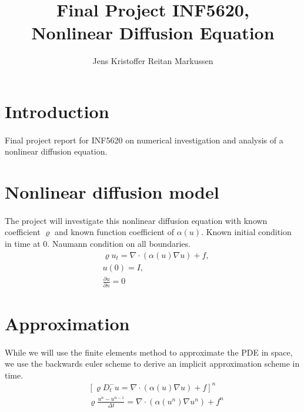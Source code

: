 \documentclass[11pt,a4paper]{article}
\author{Jens Kristoffer Reitan Markussen}
\title{Final Project INF5620,\\ Nonlinear Diffusion Equation}
\begin{document}
\maketitle

\section{Introduction}
\paragraph*{}
Final project report for INF5620 on numerical investigation and analysis of a nonlinear diffusion equation.

\section{Nonlinear diffusion model}
\paragraph*{}
The project will investigate this nonlinear diffusion equation with known coefficient $\varrho$ and known function coefficient of $\alpha(u)$. Known initial condition in time at $0$. Naumann condition on all boundaries.
\begin{align}
& \varrho u_t = \nabla \cdot (\alpha(u)\nabla u) + f,\\
& u(0)=I,\\
& \frac{\partial u}{\partial n} = 0
\end{align}

\section{Approximation}
\paragraph*{} 
While we will use the finite elements method to approximate the PDE in space, we use the backwards euler scheme to derive an implicit approximation scheme in time.
\begin{align}
 & \left[\varrho D^-_t u  = \nabla \cdot (\alpha(u)\nabla u) + f\right]^n\\
 & \varrho \frac{u^n-u^{n-1}}{\Delta t} = \nabla \cdot (\alpha(u^n)\nabla u^n)+ f^n %
\end{align}
\end{document}
